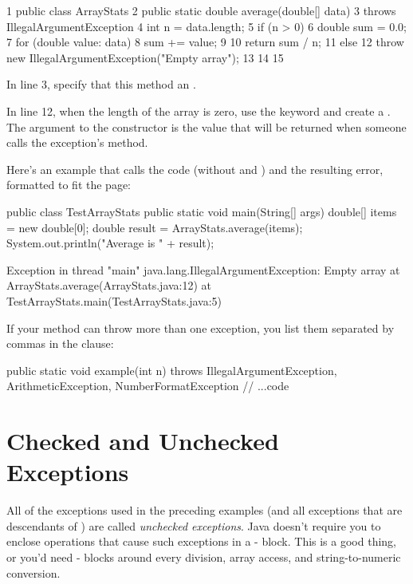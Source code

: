 \begin{code}
 1  public class ArrayStats {
 2    public static double average(double[] data) 
 3     throws IllegalArgumentException {
 4      int n = data.length;
 5      if (n > 0) {
 6        double sum = 0.0;
 7        for (double value: data) {
 8          sum += value;
 9        }
10        return sum / n;
11      } else {
12        throw new IllegalArgumentException("Empty array");
13      }
14    }
15  }
\end{code}

In line 3, specify that this method  an .

In line 12, when the length of the array is zero, use the keyword  and create a  . The argument to the constructor is the value that will be returned when someone calls
the exception's  method.

Here's an example that calls the code (without  and ) and the resulting error, formatted to fit the page:

\begin{code}
public class TestArrayStats {
    public static void main(String[] args) {
        double[] items = new double[0];
        double result = ArrayStats.average(items);
        System.out.println("Average is " + result);
    }
}

Exception in thread "main"
  java.lang.IllegalArgumentException: Empty array
        at ArrayStats.average(ArrayStats.java:12)
        at TestArrayStats.main(TestArrayStats.java:5)
\end{code}

If your method can throw more than one exception, you list them separated by commas in the  clause:

\begin{code}
public static void example(int n) throws IllegalArgumentException,
  ArithmeticException, NumberFormatException {
    // ...code
}
\end{code}

\section{Checked and Unchecked Exceptions}

All of the exceptions used in the preceding examples (and all exceptions that are descendants of ) are called {\em unchecked exceptions}. Java doesn't require you to enclose operations that cause such exceptions in a - block. This is a good thing, or you'd need - blocks around every division, array access, and string-to-numeric conversion.

